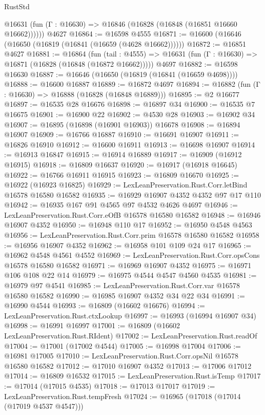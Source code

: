 \begin{lexlean}{RustStd}
\begin{coremodule}
{\begin{coremodule}
{{{{{{{{{{{{{{{{{{{{{{{{{{{{{{{{{{{{{{{{{{{{{{{{{{{{{{{      @16631 (fun (Γ : @16630) => @16846 (@16828 (@16848 (@16851 @16660 @16662))))))
    @4627
@16864 := @16598 @4555
@16871 := @16600 (@16646 (@16650 (@16819 (@16841 (@16659 (@4628 @16662))))))
@16872 := @16851 @4627
@16881 := @16864
    (fun (tail : @4555) => @16631 (fun (Γ : @16630) => @16871 (@16828 (@16848 (@16872 @16662)))))
    @4697
@16882 := @16598 @16630
@16887 := @16646 (@16650 (@16819 (@16841 (@16659 @4698))))
@16888 := @16600 @16887
@16889 := @16872 @4697
@16894 := @16882 (fun (Γ : @16630) => @16888 (@16828 (@16848 @16889)))
@16895 := @2 @16677
@16897 := @16535 @28 @16676
@16898 := @16897 @34
@16900 := @16535 @7 @16675
@16901 := @16900 @22
@16902 := @4530 @28
@16903 := @16902 @34
@16907 := @16895 (@16898 (@16901 @16903)) @16678
@16908 := @16894 @16907
@16909 := @16766 @16887
@16910 := @16691 @16907
@16911 := @16826 @16910
@16912 := @16600 @16911
@16913 := @16698 @16907
@16914 := @16913 @16847
@16915 := @16914 @16889
@16917 := @16909 (@16912 @16915)
@16918 := @16809 @16637
@16920 := @16917 (@16918 @16645)
@16922 := @16766 @16911 @16915
@16923 := @16809 @16670
@16925 := @16922 (@16923 @16825)
@16929 := LexLeanPreservation.Rust.Corr.letBind @16578 @16580 @16582
@16935 := @16929 @16907 @4352 @4352 @97 @17 @110
@16942 := @16935 @167 @91 @4565 @97 @4532 @4626 @4697
@16946 := LexLeanPreservation.Rust.Corr.eOfB @16578 @16580 @16582
@16948 := @16946 @16907 @4352
@16950 := @16948 @110 @17
@16952 := @16950 @4548 @4563
@16956 := LexLeanPreservation.Rust.Corr.prim @16578 @16580 @16582
@16958 := @16956 @16907 @4352
@16962 := @16958 @101 @109 @24 @17
@16965 := @16962 @4548 @4561 @4552
@16969 := LexLeanPreservation.Rust.Corr.opsCons @16578 @16580 @16582
@16971 := @16969 @16907 @4352
@16975 := @16971 @106 @108 @22 @14
@16979 := @16975 @4544 @4547 @4560 @4535
@16981 := @16979 @97 @4541
@16985 := LexLeanPreservation.Rust.Corr.var @16578 @16580 @16582
@16990 := @16985 @16907 @4352 @34 @22 @34
@16991 := @16990 @4544
@16993 := @16809 (@16602 @16676)
@16994 := LexLeanPreservation.Rust.ctxLookup
@16997 := @16993 (@16994 @16907 @34)
@16998 := @16991 @16997
@17001 := @16809 (@16602 LexLeanPreservation.Rust.RIdent)
@17002 := LexLeanPreservation.Rust.readOf
@17004 := @17001 (@17002 @4544)
@17005 := @16998 @17004
@17006 := @16981 @17005
@17010 := LexLeanPreservation.Rust.Corr.opsNil @16578 @16580 @16582
@17012 := @17010 @16907 @4352
@17013 := @17006 @17012
@17014 := @16809 @16532
@17015 := LexLeanPreservation.Rust.isTemp
@17017 := @17014 (@17015 @4535)
@17018 := @17013 @17017
@17019 := LexLeanPreservation.Rust.tempFresh
@17024 := @16965 (@17018 (@17014 (@17019 @4537 @4547)))
}}}}}}}}}}}}}}}}}}}}}}}}}}}}}}}}}}}}}}}}}}}}}}}}}}}}}}}
\end{coremodule}}
\end{coremodule}
\end{lexlean}
